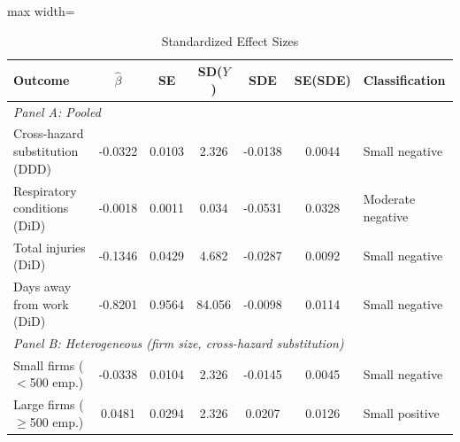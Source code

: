 \begin{table}[t]
\centering
\caption{Standardized Effect Sizes}
\label{tab:sde}
\small
\begin{adjustbox}{max width=\textwidth}
\begin{tabular}{lcccccl}
\toprule
Outcome & $\hat{\beta}$ & SE & SD($Y$) & SDE & SE(SDE) & Classification \\
\midrule
\multicolumn{7}{l}{\textit{Panel A: Pooled}} \\[3pt]
Cross-hazard substitution (DDD) & -0.0322 & 0.0103 & 2.326 & -0.0138 & 0.0044 & Small negative \\
Respiratory conditions (DiD) & -0.0018 & 0.0011 & 0.034 & -0.0531 & 0.0328 & Moderate negative \\
Total injuries (DiD) & -0.1346 & 0.0429 & 4.682 & -0.0287 & 0.0092 & Small negative \\
Days away from work (DiD) & -0.8201 & 0.9564 & 84.056 & -0.0098 & 0.0114 & Small negative \\
\midrule
\multicolumn{7}{l}{\textit{Panel B: Heterogeneous (firm size, cross-hazard substitution)}} \\[3pt]
Small firms ($<$500 emp.) & -0.0338 & 0.0104 & 2.326 & -0.0145 & 0.0045 & Small negative \\
Large firms ($\geq$500 emp.) & 0.0481 & 0.0294 & 2.326 & 0.0207 & 0.0126 & Small positive \\
\bottomrule
\end{tabular}
\end{adjustbox}
\begin{tablenotes}
\footnotesize

\end{tablenotes}
\end{table}
